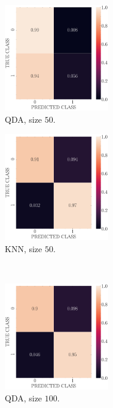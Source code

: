 \documentclass[12pt, a4 paper]{article}
\begin{document}
\begin{figure}[!htbp]
\centering
    \begin{subfigure}[!htbp]{0.24\textwidth}
       \centering
       \includegraphics[width=1.8in]{../results/ex2/conf_mtx_QD_ML_dataset_P2a_size_50.pdf}
       \caption{QDA, size $50$.}
       \label{fig:QDA_rr20_P2a_50}
    \end{subfigure}
\quad \quad
    \begin{subfigure}[!htbp]{0.24\textwidth}
       \centering
       \includegraphics[width=1.8in]{../results/ex2/conf_mtx_KNN_dataset_P2a_size_50.pdf}
       \caption{KNN, size $50$.}
       \label{fig:KNN_rr20_P2a_50}
    \end{subfigure}
\\  
    \begin{subfigure}[!htbp]{0.24\textwidth}
       \centering
       \includegraphics[width=1.8in]{../results/ex2/conf_mtx_QD_ML_dataset_P2a_size_100.pdf}
       \caption{QDA, size $100$.}
       \label{fig:QDA_rr20_P2a_100}
    \end{subfigure}
\quad \quad
    \begin{subfigure}[!htbp]{0.24\textwidth}

\end{subfigure}
\end{figure}
\end{document}
